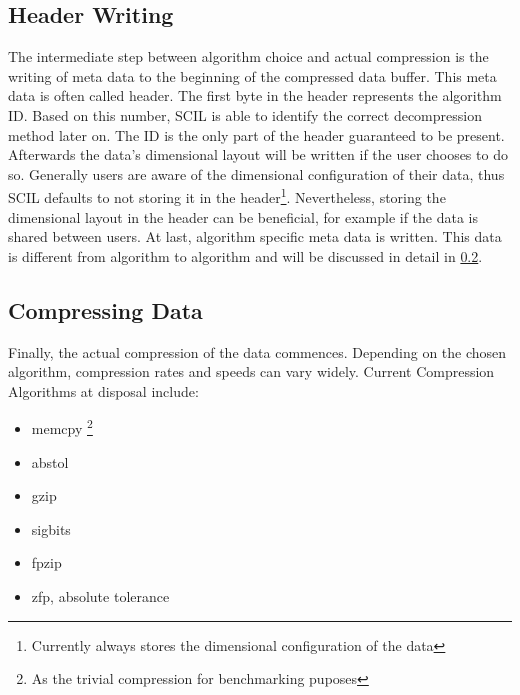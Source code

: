 \documentclass[
	12pt,
	a4paper,
	BCOR10mm,
	DIV14,
	headsepline,
]{scrreprt}
\renewcommand*{\thefootnote}{\fnsymbol{footnote}}
\begin{document}
\setcounter{footnote}{0}

\clearpage

\subsection{Header Writing}

\bigskip

\renewcommand*{\thefootnote}{\arabic{footnote}}

The intermediate step between algorithm choice and actual compression is the
writing of meta data to the beginning of the compressed data buffer. This meta
data is often called header. The first byte in the header represents the
algorithm ID. Based on this number, SCIL is able to identify the correct decompression
method later on. The ID is the only part of the header guaranteed to be present.
Afterwards the data's dimensional layout will be written if the user chooses to
do so. Generally users are aware of the dimensional configuration of their data,
thus SCIL defaults to not storing it in the header\footnote{Currently always stores the dimensional configuration of the data}.
Nevertheless, storing the
dimensional layout in the header can be beneficial, for example if the data is
shared between users. At last, algorithm specific meta data is written. This
data is different from algorithm to algorithm and will be discussed in detail
in \cref{comp_data}.

\bigskip

\subsection{Compressing Data}
\label{comp_data}

\bigskip

Finally, the actual compression of the data commences. Depending on the chosen
algorithm, compression rates and speeds can vary widely. Current Compression
Algorithms at disposal include:

\bigskip

\begin{itemize}
	\item memcpy \footnote{As the trivial compression for benchmarking puposes}
	\item abstol
	\item gzip
	\item sigbits
	\item fpzip
	\item zfp, absolute tolerance
\end{itemize}
\end{document}
